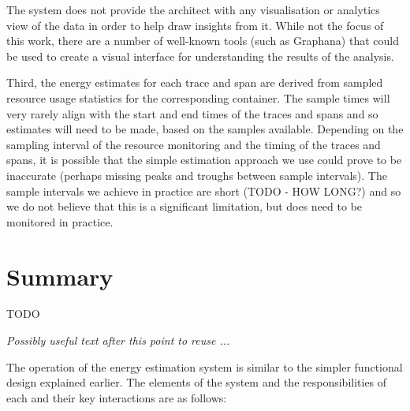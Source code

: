 The system does not provide the architect with any visualisation or analytics view of the data in order to help draw insights from it.  While not the focus of this work, there are a number of well-known tools (such as Graphana) that could be used to create a visual interface for understanding the results of the analysis.

Third, the energy estimates for each trace and span are derived from sampled resource usage statistics for the corresponding container.  The sample times will very rarely align with the start and end times of the traces and spans and so estimates will need to be made, based on the samples available.  Depending on the sampling interval of the resource monitoring and the timing of the traces and spans, it is possible that the simple estimation approach we use could prove to be inaccurate (perhaps missing peaks and troughs between sample intervals).  The sample intervals we achieve in practice are short (TODO - HOW LONG?) and so we do not believe that this is a significant limitation, but does need to be monitored in practice.

\section{Summary}

TODO

\textit{Possibly useful text after this point to reuse ...}



The operation of the energy estimation system is similar to the simpler functional design explained earlier.  The elements of the system and the responsibilities of each and their key interactions are as follows:

